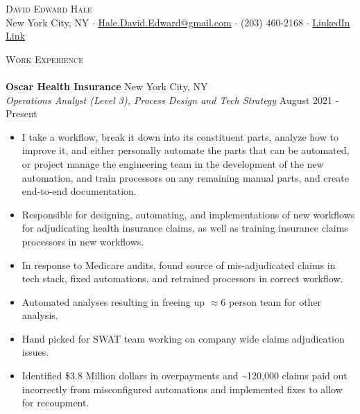 \documentclass[a4paper]{article}
\newcommand{\lineunder} {
    \vspace*{-8pt} \\
    \hspace*{-18pt} \hrulefill \\
}
\newcommand{\header} [1] {
    {\hspace*{-18pt}\vspace*{6pt} \textsc{#1}}
    \vspace*{-6pt} \lineunder
}
\begin{document}
\vspace*{-40pt}

    

\vspace*{-9pt}
\begin{center}
	{\Large \scshape {David Edward Hale}}\\
	New York City, NY $\cdot$ \href{mailto:Hale.David.Edward@gmail.com}{Hale.David.Edward@gmail.com} $\cdot$ (203) 460-2168 $\cdot$ \href{http://linkedin.com/in/david-hale-2598a791/}{LinkedIn Link}\\
\end{center}

\header{Work Experience}
\vspace{1mm}
\textbf{Oscar Health Insurance} \hfill New York City, NY\\
\textit{Operations Analyst (Level 3), Process Design and Tech Strategy} \hfill August 2021 - Present\\
\vspace{-1mm}
\begin{itemize} \itemsep 1pt
	\item 	I take a workflow, break it down into its constituent parts, analyze how to improve it, and either personally automate the parts that can be automated, or project manage the engineering team in the development of the new automation, and train processors on any remaining manual parts, and create end-to-end documentation.
	\item 	Responsible for designing, automating, and implementations of new workflows for adjudicating health insurance claims, as well as training insurance claims processors in new workflows.
	\item 	In response to Medicare audits, found source of mis-adjudicated claims in tech stack, fixed automations, and retrained processors in correct workflow.
	\item 	Automated analyses resulting in freeing up $\approx{6}$ person team for other analysis.
	\item 	Hand picked for SWAT team working on company wide claims adjudication issues.
	\item 	Identified \$3.8 Million dollars in overpayments and \textasciitilde{}120,000 claims paid out incorrectly from misconfigured automations and implemented fixes to allow for recoupment.
\end{itemize}
\end{document}
